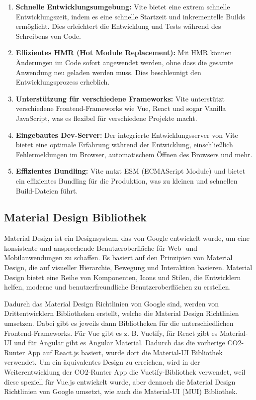 \begin{enumerate}
    \item \textbf{Schnelle Entwicklungsumgebung:} Vite bietet eine extrem schnelle Entwicklungszeit, indem es eine schnelle Startzeit und inkrementelle Builds ermöglicht. Dies erleichtert die Entwicklung und Tests während des Schreibens von Code.

    \item \textbf{Effizientes HMR (Hot Module Replacement):} Mit HMR können Änderungen im Code sofort angewendet werden, ohne dass die gesamte Anwendung neu geladen werden muss. Dies beschleunigt den Entwicklungsprozess erheblich.

    \item \textbf{Unterstützung für verschiedene Frameworks:} Vite unterstützt verschiedene Frontend-Frameworks wie Vue, React und sogar Vanilla JavaScript, was es flexibel für verschiedene Projekte macht.

    \item \textbf{Eingebautes Dev-Server:} Der integrierte Entwicklungsserver von Vite bietet eine optimale Erfahrung während der Entwicklung, einschließlich Fehlermeldungen im Browser, automatischem Öffnen des Browsers und mehr.

    \item \textbf{Effizientes Bundling:} Vite nutzt ESM (ECMAScript Module) und bietet ein effizientes Bundling für die Produktion, was zu kleinen und schnellen Build-Dateien führt.
\end{enumerate}

\subsection{Material Design Bibliothek}

Material Design ist ein Designsystem, das von Google entwickelt wurde, um eine konsistente und ansprechende Benutzeroberfläche für Web- und Mobilanwendungen zu schaffen. Es basiert auf den Prinzipien von Material Design, die auf visueller Hierarchie, Bewegung und Interaktion basieren. Material Design bietet eine Reihe von Komponenten, Icons und Stilen, die Entwicklern helfen, moderne und benutzerfreundliche Benutzeroberflächen zu erstellen. \cite{materialdesign}

Dadurch das Material Design Richtlinien von Google sind, werden von Drittentwicklern Bibliotheken erstellt, welche die Material Design Richtlinien umsetzen. Dabei gibt es jeweils dann Bibliotheken für die unterschiedlichen Frontend-Frameworks. Für Vue gibt es z. B. Vuetify, für React gibt es Material-UI und für Angular gibt es Angular Material. Dadurch das die vorherige CO2-Runter App auf React.js basiert, wurde dort die Material-UI Bibliothek verwendet. Um ein äquivalentes Design zu erreichen, wird in der Weiterentwicklung der CO2-Runter App die Vuetify-Bibliothek verwendet, weil diese speziell für Vue.js entwickelt wurde, aber dennoch die Material Design Richtlinien von Google umsetzt, wie auch die Material-UI (MUI) Bibliothek.

